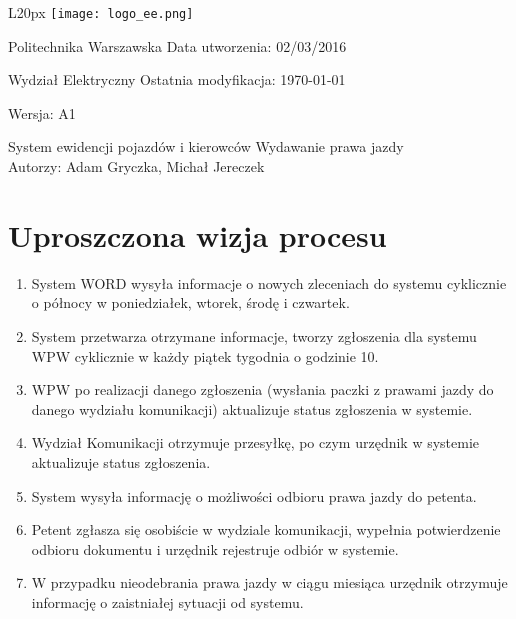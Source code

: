 \documentclass[a4paper, 12pt]{article}
\begin{document}
\begin{wrapfigure}{L}{20px}
\texttt{[image: logo\_ee.png]}
\end{wrapfigure}

Politechnika Warszawska 
\hfill Data utworzenia: 02/03/2016

Wydział Elektryczny
\hfill Ostatnia modyfikacja: \today

\hfill Wersja: A1

\quad
\begin{center}
\center \Huge System ewidencji pojazdów i kierowców 
\center \large Wydawanie prawa jazdy
\vspace{0.5cm}\\
\small Autorzy: Adam Gryczka, Michał Jereczek
\end{center}

\tableofcontents
\pagebreak

\section{Uproszczona wizja procesu}
\begin{enumerate}
	\item System WORD wysyła informacje o nowych zleceniach do systemu cyklicznie o północy w poniedziałek, wtorek, środę i czwartek.
    \item System przetwarza otrzymane informacje, tworzy zgłoszenia dla systemu WPW cyklicznie w każdy piątek tygodnia o godzinie 10.
    \item WPW po realizacji danego zgłoszenia (wysłania paczki z prawami jazdy do danego wydziału komunikacji) aktualizuje status zgłoszenia w systemie.
    \item Wydział Komunikacji otrzymuje przesyłkę, po czym urzędnik w systemie aktualizuje status zgłoszenia. 
    \item System wysyła informację o możliwości odbioru prawa jazdy do petenta.  
    \item Petent zgłasza się osobiście w wydziale komunikacji, wypełnia potwierdzenie odbioru dokumentu i urzędnik rejestruje odbiór w systemie.
    \item W przypadku nieodebrania prawa jazdy w ciągu miesiąca urzędnik otrzymuje informację o zaistniałej sytuacji od systemu.
\end{enumerate}

\pagebreak
\end{document}
